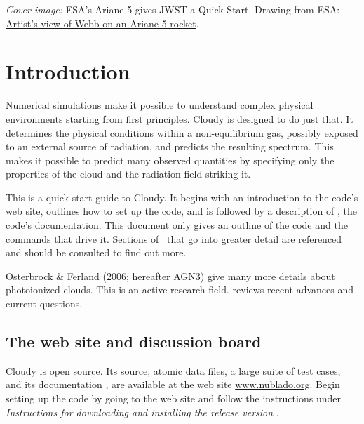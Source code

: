 \documentclass[12pt,twoside]{article}
\begin{document}
\clearpage

\vspace{5mm}
\noindent
{\small
{\em Cover image:}
ESA's Ariane 5 gives JWST a Quick Start. Drawing from ESA:
\href{https://www.esa.int/ESA_Multimedia/Images/2021/07/Artist_s_view_of_Webb_on_an_Ariane_5_rocket}{Artist's view of Webb on an Ariane 5 rocket}.
\clearpage

\setcounter{tocdepth}{2}
\tableofcontents

\clearpage

\section{Introduction}
\label{sec:Introduction}

Numerical simulations make it
possible to understand complex physical
environments starting from first principles.  Cloudy is designed to do just
that.  It determines the physical conditions within a non-equilibrium gas,
possibly exposed to an external source of radiation, and predicts the
resulting spectrum.  This makes it possible to predict many observed
quantities by specifying only the properties of the cloud and the radiation
field striking it.

This is a quick-start guide to Cloudy.  It begins with an introduction
to the code's web site, outlines how to set up the code, and is followed
by a description of \Hazy, the code's documentation.  This document only
gives an outline of the code and the commands that drive it.  Sections of
\Hazy\ that go into greater detail are referenced and should be consulted
to find out more.

Osterbrock \& Ferland (2006; hereafter AGN3) give many more details
about photoionized clouds.
This is an active research field.
\citet{Ferland03} reviews recent advances and
current questions.

\subsection{The web site and discussion board}

Cloudy is open source.  Its source, atomic data files, a large suite
of test cases, and its documentation \Hazy, are available at the web site
\href{http://www.nublado.org}{www.nublado.org}.
Begin setting up the code by going to the
web site and
follow the instructions under
\emph{Instructions for downloading and installing the release version }.

}
\end{document}
